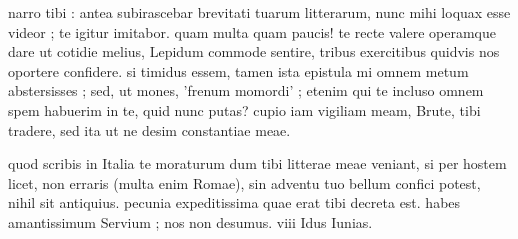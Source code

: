 


 narro tibi : antea subirascebar brevitati tuarum litterarum, nunc mihi loquax esse videor ; te igitur imitabor. quam multa quam paucis! te recte valere operamque dare ut cotidie melius, Lepidum commode sentire, tribus exercitibus quidvis nos oportere confidere. si timidus essem, tamen ista epistula mi omnem metum abstersisses ; sed, ut mones, 'frenum momordi' ; etenim qui te incluso omnem spem habuerim in te, quid nunc putas? cupio iam vigiliam meam, Brute, tibi tradere, sed ita ut ne desim constantiae meae.

 quod scribis in Italia te moraturum dum tibi litterae meae veniant, si per hostem licet, non erraris (multa enim Romae), sin adventu tuo bellum confici potest, nihil sit antiquius. pecunia expeditissima quae erat tibi decreta est. habes amantissimum Servium ; nos non desumus. viii Idus Iunias.
